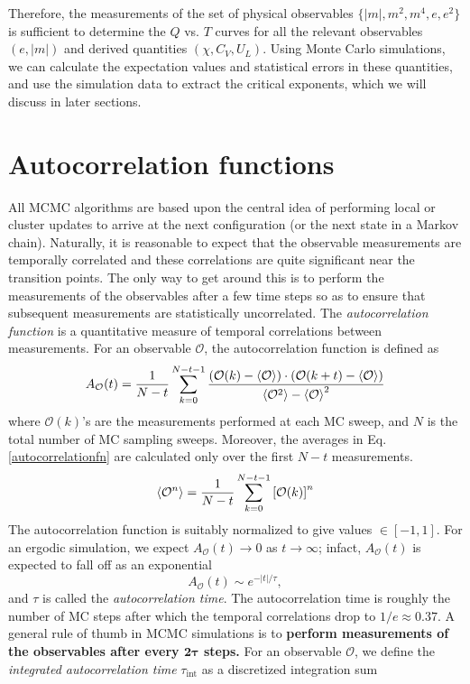 \documentclass[../thesis_main.tex]{subfiles}
\begin{document}
Therefore, the measurements of the set of physical observables $\{|m|, m^2, m^4, e, e^2\}$ is sufficient to determine the $Q$ vs. $T$ curves for all the relevant observables $(e, |m|)$  and derived quantities $(\chi, C_V, U_L)$. Using Monte Carlo simulations, we can calculate the expectation values and statistical errors in these quantities, and use the simulation data to extract the critical exponents, which we will discuss in later sections.

\section{Autocorrelation functions}
All MCMC algorithms are based upon the central idea of performing local or cluster updates to arrive at the next configuration (or the next state in a Markov chain). Naturally, it is reasonable to expect that the observable measurements are temporally correlated and these correlations are quite significant near the transition points. The only way to get around this is to perform the measurements of the observables after a few time steps so as to ensure that subsequent measurements are statistically uncorrelated.  The \textit{autocorrelation function} is a quantitative measure of temporal correlations between measurements. For an observable $\mathcal{O}$, the autocorrelation function is defined as
\begin{equation}
    A_\mathcal{O}(t) =   \frac{1}{N-t} \sum_{k=0}^{N-t-1}\frac{\qty(\mathcal{O}(k) - \expval{\mathcal{O}})\cdot\qty(\mathcal{O}(k+t) - \expval{\mathcal{O}})}{\expval{\mathcal{O}^2} - \expval{\mathcal{O}}^2}
    \label{autocorrelationfn}
\end{equation}  
where $\mathcal{O}(k)$'s are the measurements performed at each MC sweep, and $N$ is the total number of MC sampling sweeps. Moreover, the averages in Eq. \eqref{autocorrelationfn} are calculated only over the first $N-t$ measurements. 
\begin{equation}
    \expval{\mathcal{O}^n} = \frac{1}{N-t} \sum_{k=0}^{N-t-1} \qty[\mathcal{O}(k)]^n
\end{equation}
The autocorrelation function is suitably normalized to give values $\in [-1,1]$. For an ergodic simulation, we expect $A_\mathcal{O}(t) \to 0$ as $t \to \infty$; infact, $A_\mathcal{O}(t)$ is expected to fall off as an exponential
\begin{equation}
    A_\mathcal{O}(t) \sim e^{-|t|/\tau },
\end{equation}
and $\tau $ is called the \textit{autocorrelation time}. The autocorrelation time is roughly the number of MC steps after which the temporal correlations drop to $1/e \approx 0.37$. A general rule of thumb in MCMC simulations is to \textbf{perform measurements of the observables after every $\boldsymbol{2} \boldsymbol{\tau}$ steps.} For an observable $\mathcal{O}$, we define the \textit{integrated autocorrelation time} $\tau_\text{int}$ as a discretized integration sum
\end{document}
